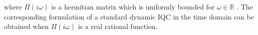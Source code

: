\documentclass[letterpaper,10pt,conference,twocolumn]{IEEEtran}
\newtheorem{lem}[thm]{Lemma}
\newcommand{\w}{\omega}
\newcommand{\Real}{\mathbb{R}}
\begin{document}
where $\Pi(i\w)$ is a hermitian matrix which is uniformly bounded for $\w\in\Real$ \cite{MegRan97}.
The corresponding formulation of a standard dynamic IQC in the time domain can be obtained when $\Pi(i\w)$ is a real rational function.\\
\end{document}
